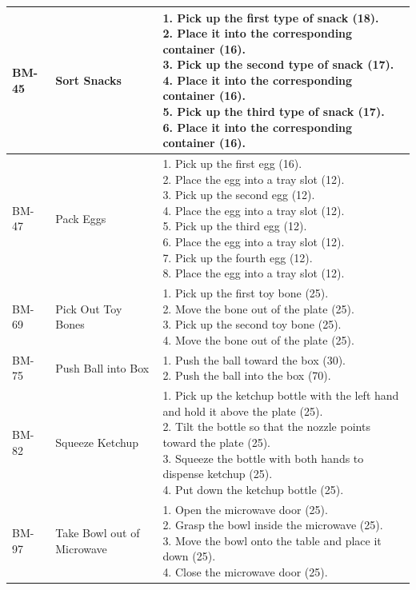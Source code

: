 \begin{table}[ht!]
\begin{tabular}{p{} p{} p{}}
BM-45 & Sort Snacks &
\makecell[l]{
1. Pick up the first type of snack (18). \\
2. Place it into the corresponding container (16). \\
3. Pick up the second type of snack (17). \\
4. Place it into the corresponding container (16). \\
5. Pick up the third type of snack (17). \\
6. Place it into the corresponding container (16).
} \\
\midrule

BM-47 & Pack Eggs &
\makecell[l]{
1. Pick up the first egg (16). \\
2. Place the egg into a tray slot (12). \\
3. Pick up the second egg (12). \\
4. Place the egg into a tray slot (12). \\
5. Pick up the third egg (12). \\
6. Place the egg into a tray slot (12). \\
7. Pick up the fourth egg (12). \\
8. Place the egg into a tray slot (12).
} \\
\midrule

BM-69 & Pick Out Toy Bones &
\makecell[l]{
1. Pick up the first toy bone (25). \\
2. Move the bone out of the plate (25). \\
3. Pick up the second toy bone (25). \\
4. Move the bone out of the plate (25).
} \\
\midrule

BM-75 & Push Ball into Box &
\makecell[l]{
1. Push the ball toward the box (30). \\
2. Push the ball into the box (70).
} \\
\midrule

BM-82 & Squeeze Ketchup &
\makecell[l]{
1. Pick up the ketchup bottle with the left hand and hold it above the plate (25). \\
2. Tilt the bottle so that the nozzle points toward the plate (25). \\
3. Squeeze the bottle with both hands to dispense ketchup (25). \\
4. Put down the ketchup bottle (25).
} \\
\midrule

BM-97 & Take Bowl out of Microwave &
\makecell[l]{
1. Open the microwave door (25). \\
2. Grasp the bowl inside the microwave (25). \\
3. Move the bowl onto the table and place it down (25). \\
4. Close the microwave door (25).
} \\
\midrule


\end{tabular}
\end{table}
